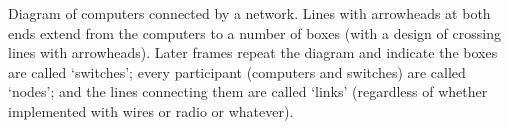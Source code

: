 \begin{frame}
{
}{
Diagram of computers connected by a network. Lines with arrowheads
at both ends extend from the computers to a number of boxes (with
a design of crossing lines with arrowheads). Later frames
repeat the diagram and indicate the boxes are called `switches';
every participant (computers and switches) are called `nodes';
and the lines connecting them are called `links' (regardless
of whether implemented with wires or radio or whatever).
}
\end{frame}


